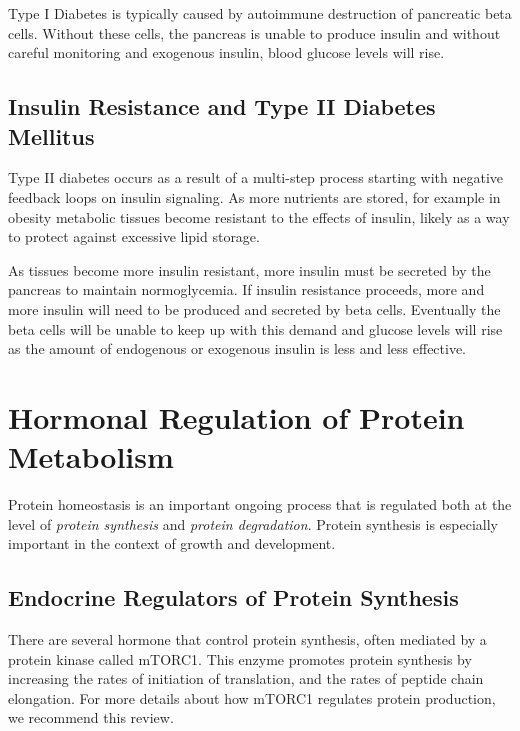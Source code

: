 \documentclass{tufte-handout}
\begin{document}
Type I Diabetes is typically caused by autoimmune destruction of pancreatic beta cells.  Without these cells, the pancreas is unable to produce insulin and without careful monitoring and exogenous insulin, blood glucose levels will rise.

\subsection{Insulin Resistance and Type II Diabetes Mellitus}

Type II diabetes occurs as a result of a multi-step process starting with negative feedback loops on insulin signaling.  As more nutrients are stored, for example in obesity metabolic tissues become resistant to the effects of insulin, likely as a way to protect against excessive lipid storage.  

As tissues become more insulin resistant, more insulin must be secreted by the pancreas to maintain normoglycemia.  If insulin resistance proceeds, more and more insulin will need to be produced and secreted by beta cells.  Eventually the beta cells will be unable to keep up with this demand and glucose levels will rise as the amount of endogenous or exogenous insulin is less and less effective.

\section{Hormonal Regulation of Protein Metabolism}
Protein homeostasis is an important ongoing process that is regulated both at the level of \emph{protein synthesis} and \emph{protein degradation}.  Protein synthesis is especially important in the context of growth and development.  

\subsection{Endocrine Regulators of Protein Synthesis}

There are several hormone that control protein synthesis, often mediated by a protein kinase called mTORC1.   This enzyme promotes protein synthesis by increasing the rates of initiation of translation, and the rates of peptide chain elongation.  For more details about how mTORC1 regulates protein production, we recommend this review\cite{Gingras2004}.
\end{document}
